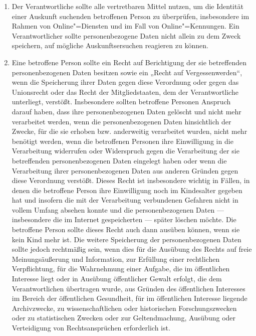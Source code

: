 \begin{enumerate}

   \item Der Verantwortliche sollte alle vertretbaren Mittel nutzen, um die Identität einer Auskunft suchenden
    betroffenen Person zu überprüfen, insbesondere im Rahmen von Online"=Diensten und im Fall von Online"=Kennungen.
    Ein Verantwortlicher sollte personenbezogene Daten nicht allein zu dem Zweck speichern, auf mögliche
    Auskunftsersuchen reagieren zu können.%
   \label{eg:64}
   

   \item Eine betroffene Person sollte ein Recht auf Berichtigung der sie betreffenden personenbezogenen Daten besitzen
    sowie ein „Recht auf Vergessenwerden“, wenn die Speicherung ihrer Daten gegen diese Verordnung oder gegen das
    Unionsrecht oder das Recht der Mitgliedstaaten, dem der Verantwortliche unterliegt, verstößt. Insbesondere sollten
    betroffene Personen Anspruch darauf haben, dass ihre personenbezogenen Daten gelöscht und nicht mehr verarbeitet
    werden, wenn die personenbezogenen Daten hinsichtlich der Zwecke, für die sie erhoben bzw. anderweitig verarbeitet
    wurden, nicht mehr benötigt werden, wenn die betroffenen Personen ihre Einwilligung in die Verarbeitung widerrufen
    oder Widerspruch gegen die Verarbeitung der sie betreffenden personenbezogenen Daten eingelegt haben oder wenn die
    Verarbeitung ihrer personenbezogenen Daten aus anderen Gründen gegen diese Verordnung verstößt. Dieses Recht ist
    insbesondere wichtig in Fällen, in denen die betroffene Person ihre Einwilligung noch im Kindesalter gegeben hat
    und insofern die mit der Verarbeitung verbundenen Gefahren nicht in vollem Umfang absehen konnte und die
    personenbezogenen Daten — insbesondere die im Internet gespeicherten — später löschen möchte. Die betroffene Person
    sollte dieses Recht auch dann ausüben können, wenn sie kein Kind mehr ist. Die weitere Speicherung der
    personenbezogenen Daten sollte jedoch rechtmäßig sein, wenn dies für die Ausübung des Rechts auf freie
    Meinungsäußerung und Information, zur Erfüllung einer rechtlichen Verpflichtung, für die Wahrnehmung einer Aufgabe,
    die im öffentlichen Interesse liegt oder in Ausübung öffentlicher Gewalt erfolgt, die dem Verantwortlichen
    übertragen wurde, aus Gründen des öffentlichen Interesses im Bereich der öffentlichen Gesundheit, für im
    öffentlichen Interesse liegende Archivzwecke, zu wissenschaftlichen oder historischen Forschungszwecken oder zu
    statistischen Zwecken oder zur Geltendmachung, Ausübung oder Verteidigung von Rechtsansprüchen erforderlich ist.%
   \label{eg:65}
   

\end{enumerate}
